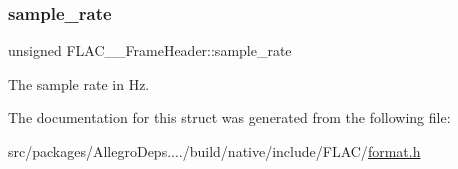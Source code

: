 \subsubsection{\texorpdfstring{sample\+\_\+rate}{sample\_rate}}
{\footnotesize\ttfamily unsigned F\+L\+A\+C\+\_\+\+\_\+\+Frame\+Header\+::sample\+\_\+rate}

The sample rate in Hz. 

The documentation for this struct was generated from the following file\+:\begin{DoxyCompactItemize}
\item 
src/packages/\+Allegro\+Deps..../build/native/include/\+F\+L\+A\+C/\hyperlink{format_8h}{format.\+h}\end{DoxyCompactItemize}

